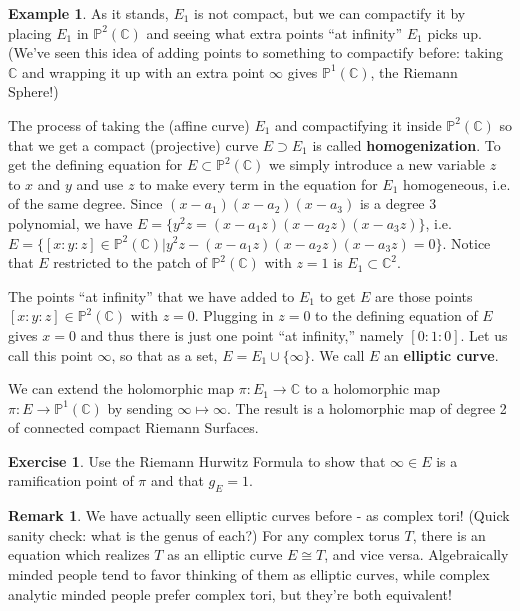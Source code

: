 \documentclass[12pt]{book}%
\theoremstyle{plain}
\theoremstyle{definition}
\newtheorem{example}[theorem]{Example}
\newtheorem{exercise}{Exercise}
\newtheorem{remark}[theorem]{Remark}
\theoremstyle{remark}
\def\to{\rightarrow}
\def\bC{{\mathbb{C}}}
\newcommand{\PoneC}{{\mathbb P}^1({\mathbb C})}
\newcommand{\PtwoC}{{\mathbb P}^2({\mathbb C})}
\begin{document}
\begin{example}
As it stands, $E_1$ is not compact, but we can compactify it by placing $E_1$ in $\PtwoC$ and seeing what extra points ``at infinity'' $E_1$ picks up. (We've seen this idea of adding points to something to compactify before: taking $\bC$ and wrapping it up with an extra point $\infty$ gives $\PoneC$, the Riemann Sphere!)

The process of taking the (affine curve) $E_1$ and compactifying it inside $\PtwoC$ so that we get a compact (projective) curve $E \supset E_1$ is called \textbf{homogenization}. To get the defining equation for $E \subset \PtwoC$ we simply introduce a new variable $z$ to $x$ and $y$ and use $z$ to make every term in the equation for $E_1$ homogeneous, i.e. of the same degree. Since $(x-a_1)(x-a_2)(x-a_3)$ is a degree 3 polynomial, we have $E = \{y^2z = (x-a_1z)(x-a_2z)(x-a_3z)\}$, i.e. $E = \{[x:y:z]\in \PtwoC |y^2z - (x-a_1z)(x-a_2z)(x-a_3z)=0\}$. Notice that $E$ restricted to the patch of $\PtwoC$ with $z=1$ is $E_1\subset \bC^2$.

The points ``at infinity'' that we have added to $E_1$ to get $E$ are those points $[x:y:z] \in \PtwoC$ with $z=0$. Plugging in $z=0$ to the defining equation of $E$ gives $x=0$ and thus there is just one point ``at infinity,'' namely $[0:1:0]$. Let us call this point $\infty$, so that as a set, $E = E_1 \cup \{\infty\}$. We call $E$ an \textbf{elliptic curve}.

We can extend the holomorphic map $\pi:E_1 \to \bC$ to a holomorphic map $\pi:E \to \PoneC$ by sending $\infty \mapsto \infty$. The result is a holomorphic map of degree 2 of connected compact Riemann Surfaces.

\begin{exercise}
\label{ellipticCurveRamificationEx}
Use the Riemann Hurwitz Formula to show that $\infty \in E$ is a ramification point of $\pi$ and that $g_E = 1$.
\end{exercise}
\end{example}



\begin{remark}
We have actually seen elliptic curves before - as complex tori! (Quick sanity check: what is the genus of each?) For any complex torus $T$, there is an equation which realizes $T$ as an elliptic curve $E \cong T$, and vice versa. Algebraically minded people tend to favor thinking of them as elliptic curves, while complex analytic minded people prefer complex tori, but they're both equivalent!
\end{remark}
\end{document}

